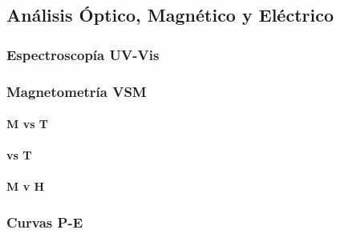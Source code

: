 \documentclass[../main.tex]{subfiles}
\begin{document}
\subsection{Análisis Óptico, Magnético y Eléctrico} \label{sec:analisisoptmagelec}
\subsubsection{Espectroscopía UV-Vis}

\subsubsection{Magnetometría VSM}

\paragraph{M vs T}

\paragraph{\textchi{} vs T}

\paragraph{M v H}
\subsubsection{Curvas P-E}
\end{document}
